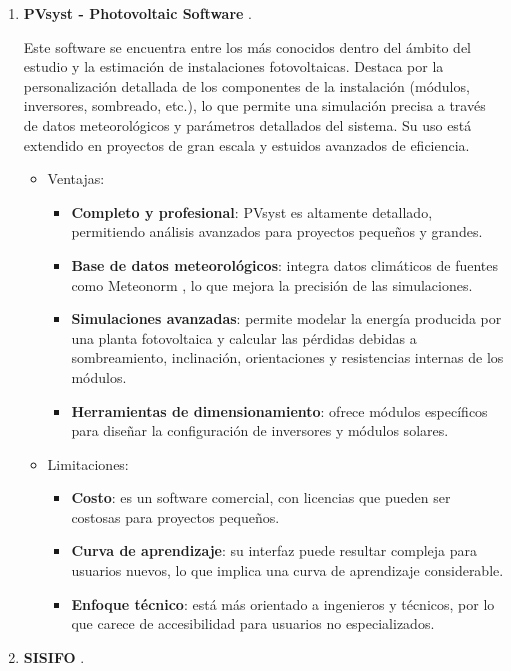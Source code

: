 \begin{enumerate}
\item \textbf{PVsyst - Photovoltaic Software} \cite{pvsyst}.

Este software se encuentra entre los más conocidos dentro del ámbito del estudio y la estimación de instalaciones fotovoltaicas. Destaca por la personalización detallada de los componentes de la instalación (módulos, inversores, sombreado, etc.), lo que permite una simulación precisa a través de datos meteorológicos y parámetros detallados del sistema. Su uso está extendido en proyectos de gran escala y estuidos avanzados de eficiencia.
\begin{itemize}
\item Ventajas:
\begin{itemize}
\item \textbf{Completo y profesional}: PVsyst es altamente detallado, permitiendo análisis avanzados para proyectos pequeños y grandes.
\item \textbf{Base de datos meteorológicos}: integra datos climáticos de fuentes como Meteonorm \cite{jan20}, lo que mejora la precisión de las simulaciones.
\item \textbf{Simulaciones avanzadas}: permite modelar la energía producida por una planta fotovoltaica y calcular las pérdidas debidas a sombreamiento, inclinación, orientaciones y resistencias internas de los módulos.
\item \textbf{Herramientas de dimensionamiento}: ofrece módulos específicos para diseñar la configuración de inversores y módulos solares.
\end{itemize}
\item Limitaciones:
\begin{itemize}
\item \textbf{Costo}: es un software comercial, con licencias que pueden ser costosas para proyectos pequeños.
\item \textbf{Curva de aprendizaje}: su interfaz puede resultar compleja para usuarios nuevos, lo que implica una curva de aprendizaje considerable.
\item \textbf{Enfoque técnico}: está más orientado a ingenieros y técnicos, por lo que carece de accesibilidad para usuarios no especializados.
\end{itemize}
\end{itemize}
\item \textbf{SISIFO} \cite{sisifo}.


\end{enumerate}
